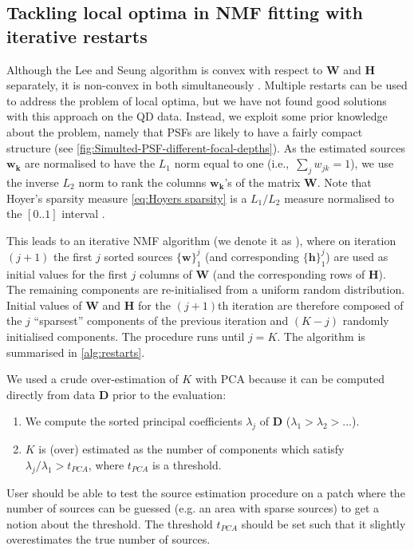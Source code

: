 \clearpage
\subsection{Tackling local optima in NMF fitting with iterative restarts \label{sub: Iterative restarts}}

Although the Lee and Seung algorithm is convex with respect to $\bm{W}$ and $\bm{H}$ separately, it is non-convex in both simultaneously \cite{Lee2001}. Multiple restarts can be used to address the problem of local optima, but we have not found good solutions with this approach on the QD data. Instead, we exploit some prior knowledge about the problem, namely that PSFs are likely to have a fairly compact structure (see \autoref{fig:Simulted-PSF-different-focal-depths}). As the estimated sources $\bm{w_k}$ are normalised to have the $L_1$ norm equal to one (i.e.,\ $\sum_{j}w_{jk}=1$), we use the inverse $L_2$ norm to rank the columns $\bm{w_k}$'s of the matrix $\bm{W}$. Note that Hoyer's sparsity measure \autoref{eq:Hoyers sparsity} is a $L_1/L_2$ measure normalised to the $[0..1]$ interval \cite{Kim2008}. 

This leads to an iterative NMF algorithm (we denote it as \inmf{}), where on iteration $(j+1)$ the first $j$ sorted sources $\{ \bm{w} \}_1^j$ (and corresponding $\{ \bm{h} \}_1^j$) are used as initial values for the first $j$ columns of $\bm{W}$ (and the corresponding rows of $\bm{H}$). The remaining components are re-initialised from a uniform random distribution. Initial values of $\bm{W}$ and $\bm{H}$ for the $(j+1)$th iteration are therefore composed of the $j$ ``sparsest'' components of the previous iteration and $(K-j)$ randomly initialised components. The procedure runs until $j=K$. The \inmf{} algorithm is summarised in \autoref{alg:restarts}. 

We used a crude over-estimation of $K$ with PCA because it can be computed directly from data $\bm{D}$ prior to the evaluation: 
%
\begin{enumerate}
	\item
	We compute the sorted principal coefficients $\lambda_{j}$ of $\bm{D}$ ($\lambda_{1}>\lambda_{2}>...$). 
	\item
	$K$ is (over) estimated as the number of components which satisfy $\lambda_{j}/\lambda_{1}>t_{PCA}$, where $t_{PCA}$ is a threshold. 
\end{enumerate}
%
User should be able to test the source estimation procedure on a patch where the number of sources can be guessed (e.g. an area with sparse sources) to get a notion about the threshold. The threshold $t_{PCA}$ should be set such that it slightly overestimates the true number of sources.


